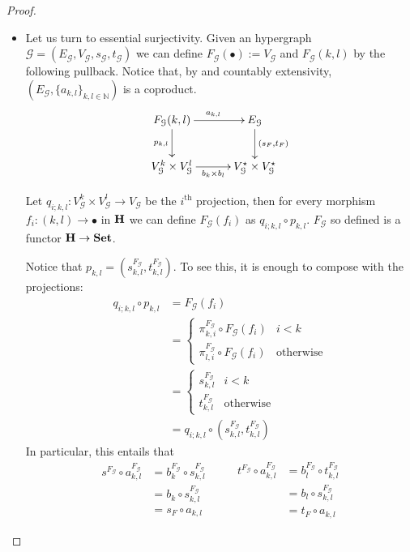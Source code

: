 \documentclass[runningheads,envcountsect]{lipics-v2021}
\newcommand{\catname}[1]{\textbf{\textup{#1}}}
\begin{document}
\begin{proof}
\begin{itemize}
		\item  Let us turn to essential surjectivity. Given an hypergraph $\mathcal{G}=(E_\mathcal{G}, V_\mathcal{G}, s_\mathcal{G}, t_\mathcal{G})$ we can define $F_{\mathcal{G}}(\bullet):=V_{\mathcal{G}}$ and $F_{\mathcal{G}}(k,l)$ by the following pullback. Notice that, by  and countably extensivity, $(E_{\mathcal{{G}}}, \{a_{k,l}\}_{k,l\in \mathbb{N}})$ is a coproduct.
		\[\xymatrix@C=30pt{F_\mathcal{G}(k,l) \ar[d]_{p_{k,l}}  \ar[r]^{a_{k,l}}& E_{\mathcal{G}} \ar[d]^{(s_F, t_F)} \\ V_{\mathcal{G}}^k\times V_{\mathcal{G}}^l \ar[r]_{b_k\times b_l} & V_{\mathcal{G}}^\star\times V_{\mathcal{G}}^\star}\]
		
		Let $q_{i;k,l}\colon V_\mathcal{G}^k\times V_{\mathcal{G}}^l\to V_\mathcal{G} $ be the $i^{\text{th}}$ projection, then for every morphism $f_i\colon (k,l)\to \bullet$ in $\catname{H}$ we can define $F_{\mathcal{G}}(f_i)$ as $q_{i; k,l}\circ p_{k,l}$. $F_{\mathcal{G}}$ so defined is a functor $\catname{H}\to \catname{Set}$. 
		
		Notice that $p_{k,l}=(s^{F_{\mathcal{G}}}_{k,l}, t^{F_{\mathcal{G}}}_{k,l})$. To see this, it is enough to compose with the projections:
		\begin{align*}
			q_{i;k,l}\circ p_{k,l}&=F_{\mathcal{G}}(f_i)\\&=\begin{cases}
				\pi^{F_{\mathcal{G}}}_{k, i} \circ F_{\mathcal{G}}(f_i) & i<k\\
				\pi^{F_{\mathcal{G}}}_{l, i} \circ F_{\mathcal{G}}(f_i) &\text{otherwise}
			\end{cases}\\&=\begin{cases}
		s^{F_{\mathcal{G}}}_{k,l} & i<k\\
		t^{F_{\mathcal{G}}}_{k,l} &\text{otherwise}
			\end{cases}\\&=q_{i;k,l}\circ (s^{F_{\mathcal{G}}}_{k,l}, t^{F_{\mathcal{G}}}_{k,l})
		\end{align*}
		In particular, this entails that 
		\[\begin{split}
	s^{F_{\mathcal{G}}}\circ a^{F_{\mathcal{G}}}_{k,l}&=b^{F_{\mathcal{G}}}_k \circ s^{F_{\mathcal{G}}}_{k,l}\\&= b_k \circ s^{F_{\mathcal{G}}}_{k,l}\\&=s_F\circ a_{k,l}
		\end{split} \qquad \begin{split}
	t^{F_{\mathcal{G}}}\circ a^{F_{\mathcal{G}}}_{k,l}&=b^{F_{\mathcal{G}}}_l \circ t^{F_{\mathcal{G}}}_{k,l}\\&= b_l \circ s^{F_{\mathcal{G}}}_{k,l}\\&=t_F\circ a_{k,l}
		\end{split}\]
	

\end{itemize}
\end{proof}
\end{document}
